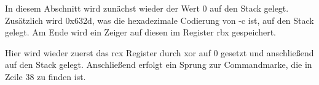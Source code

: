 \documentclass[12pt]{article}
\begin{document}
			
			In diesem Abschnitt wird zun\"achst wieder der Wert 0 auf den Stack gelegt. Zus\"atzlich wird 0x632d, was die hexadezimale Codierung von -c ist, auf den Stack gelegt. Am Ende wird ein Zeiger auf diesen im Register rbx gespeichert.
			
			
			Hier wird wieder zuerst das rcx Register durch xor auf 0 gesetzt und anschlie{\ss}end auf den Stack gelegt. Anschlie{\ss}end erfolgt ein Sprung zur Commandmarke, die in Zeile 38 zu finden ist.
			
\end{document}
